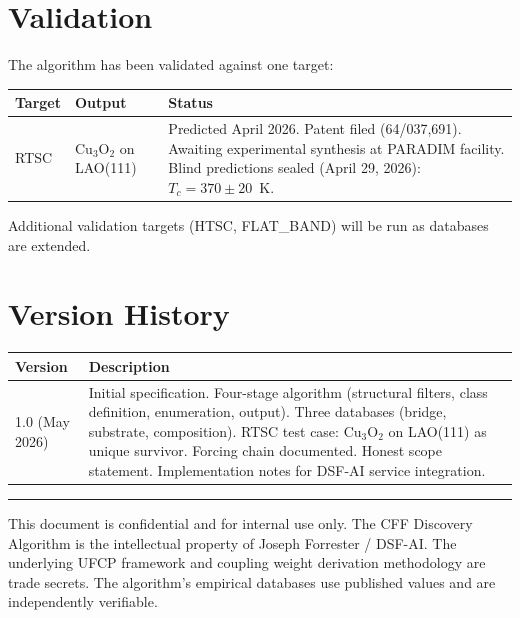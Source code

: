 \documentclass[11pt, a4paper]{article}
\begin{document}
\section{Validation}

The algorithm has been validated against one target:

\begin{center}
\begin{tabular}{@{}llp{6cm}@{}}
\toprule
\textbf{Target} & \textbf{Output} & \textbf{Status} \\
\midrule
RTSC & Cu$_3$O$_2$ on LAO(111) & Predicted April 2026.
  Patent filed (64/037,691). Awaiting experimental
  synthesis at PARADIM facility. Blind predictions
  sealed (April 29, 2026): $T_c = 370 \pm 20$~K. \\
\bottomrule
\end{tabular}
\end{center}

Additional validation targets (HTSC, FLAT\_BAND) will be run as
databases are extended.

\section{Version History}

\begin{center}
\begin{tabular}{@{}lp{10.5cm}@{}}
\toprule
\textbf{Version} & \textbf{Description} \\
\midrule
1.0 (May 2026) & Initial specification. Four-stage algorithm
  (structural filters, class definition, enumeration, output).
  Three databases (bridge, substrate, composition). RTSC test
  case: Cu$_3$O$_2$ on LAO(111) as unique survivor. Forcing
  chain documented. Honest scope statement. Implementation
  notes for DSF-AI service integration. \\
\bottomrule
\end{tabular}
\end{center}

\vspace{2em}
\hrule
\vspace{0.5em}
{\color{nm-gray}\small This document is confidential and for
internal use only. The CFF Discovery Algorithm is the intellectual
property of Joseph Forrester / DSF-AI. The underlying UFCP
framework and coupling weight derivation methodology are trade
secrets. The algorithm's empirical databases use published values
and are independently verifiable.}
\end{document}
